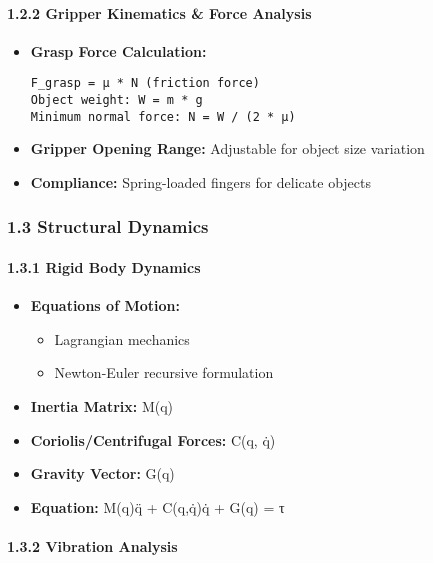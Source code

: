 \documentclass[
]{article}
\providecommand{\tightlist}{%
  \setlength{\itemsep}{0pt}\setlength{\parskip}{0pt}}
\begin{document}
\hypertarget{gripper-kinematics-force-analysis}{%
\paragraph{1.2.2 Gripper Kinematics \& Force
Analysis}\label{gripper-kinematics-force-analysis}}

\begin{itemize}
\item
  \textbf{Grasp Force Calculation:}

\begin{verbatim}
F_grasp = μ * N (friction force)
Object weight: W = m * g
Minimum normal force: N = W / (2 * μ)
\end{verbatim}
\item
  \textbf{Gripper Opening Range:} Adjustable for object size variation
\item
  \textbf{Compliance:} Spring-loaded fingers for delicate objects
\end{itemize}

\hypertarget{structural-dynamics}{%
\subsubsection{1.3 Structural Dynamics}\label{structural-dynamics}}

\hypertarget{rigid-body-dynamics}{%
\paragraph{1.3.1 Rigid Body Dynamics}\label{rigid-body-dynamics}}

\begin{itemize}
\tightlist
\item
  \textbf{Equations of Motion:}

  \begin{itemize}
  \tightlist
  \item
    Lagrangian mechanics
  \item
    Newton-Euler recursive formulation
  \end{itemize}
\item
  \textbf{Inertia Matrix:} M(q)
\item
  \textbf{Coriolis/Centrifugal Forces:} C(q, q̇)
\item
  \textbf{Gravity Vector:} G(q)
\item
  \textbf{Equation:} M(q)q̈ + C(q,q̇)q̇ + G(q) = τ
\end{itemize}

\hypertarget{vibration-analysis}{%
\paragraph{1.3.2 Vibration Analysis}\label{vibration-analysis}}
\end{document}
